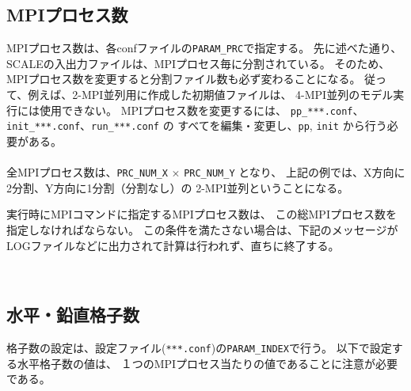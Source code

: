 \subsection{MPIプロセス数}

MPIプロセス数は、各confファイルの\verb|PARAM_PRC|で指定する。
先に述べた通り、SCALEの入出力ファイルは、MPIプロセス毎に分割されている。
そのため、MPIプロセス数を変更すると分割ファイル数も必ず変わることになる。
従って、例えば、2-MPI並列用に作成した初期値ファイルは、
4-MPI並列のモデル実行には使用できない。
MPIプロセス数を変更するには、
\verb|pp_***.conf|、\verb|init_***.conf|、\verb|run_***.conf| の
すべてを編集・変更し、\verb|pp|, \verb|init| から行う必要がある。\\

\\


全MPIプロセス数は、\verb|PRC_NUM_X| $\times$ \verb|PRC_NUM_Y|  となり、
上記の例では、X方向に2分割、Y方向に1分割（分割なし）の
2-MPI並列ということになる。

実行時にMPIコマンドに指定するMPIプロセス数は、
この総MPIプロセス数を指定しなければならない。
この条件を満たさない場合は、下記のメッセージが
LOGファイルなどに出力されて計算は行われず、直ちに終了する。

\\





\subsection{水平・鉛直格子数}

格子数の設定は、設定ファイル(\verb|***.conf|)の\verb|PARAM_INDEX|で行う。
以下で設定する水平格子数の値は、
１つのMPIプロセス当たりの値であることに注意が必要である。\\

